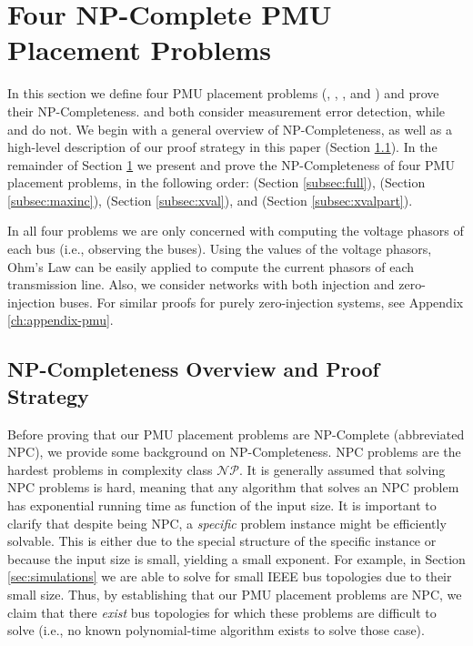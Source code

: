 \section{Four NP-Complete PMU Placement Problems}
\label{sec:problem-analysis}


In this section we define four PMU placement problems (\fulls, \maxincs, \xvals, and \xvalparts) and prove their NP-Completeness. 
\xval and \xvalpart both consider measurement error detection, while \full and \maxinc do not.  
We begin with a general overview of NP-Completeness, as well as a high-level description of our proof strategy in this paper (Section \ref{subsec:proofstrat}). 
In the remainder of Section \ref{sec:problem-analysis} we present and prove the NP-Completeness of four PMU placement problems, 
in the following order: \full (Section \ref{subsec:full}), \maxinc (Section \ref{subsec:maxinc}), \xval (Section \ref{subsec:xval}), and \xvalpart (Section \ref{subsec:xvalpart}).

In all four problems we are only concerned with computing the voltage phasors of each bus (i.e., observing the buses). Using the values of the voltage phasors,
Ohm's Law can be easily applied to compute the current phasors of each transmission line.
Also, we consider networks with both injection and zero-injection buses. For similar proofs for purely zero-injection systems, see Appendix \ref{ch:appendix-pmu}.


\subsection{NP-Completeness Overview and Proof Strategy}
\label{subsec:proofstrat}

Before proving that our PMU placement problems are NP-Complete (abbreviated NPC), we provide some background on NP-Completeness. 
NPC problems are the hardest problems in complexity class $\mathcal{NP}$. 
It is generally assumed that solving NPC problems is hard, meaning that any algorithm that solves an NPC problem has exponential running time as function of the input size. 
It is important to clarify that despite being NPC, a {\em specific} problem instance might be efficiently solvable. This is either due to the special structure of the specific instance 
or because the input size is small, yielding a small exponent. 
For example, in Section \ref{sec:simulations} we are able to solve \full for small IEEE bus topologies due to their small size. Thus, by establishing that our PMU placement problems are NPC, 
we claim that there {\em exist} bus topologies for which these problems are difficult to solve (i.e., no known polynomial-time algorithm exists to solve those case).  

